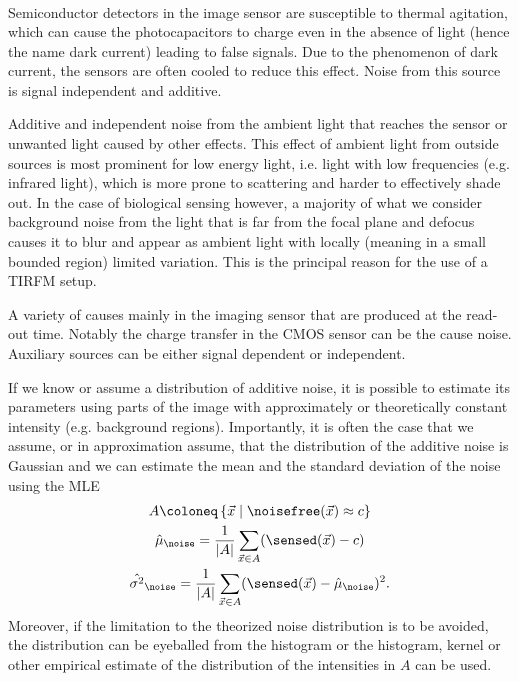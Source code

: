 \begin{description}
\begin{gather*}
            \end{gather*}
    \item[Dark current]
        Semiconductor detectors in the image sensor are susceptible to thermal agitation, which can 
            cause the photocapacitors to charge even in the absence of light (hence the name dark current) leading to 
            false signals.
        Due to the phenomenon of dark current, the sensors are often cooled to reduce this effect.
        Noise from this source is signal independent and additive.
    \item[Background noise]
        Additive and independent noise from the ambient light that reaches the sensor or unwanted light caused by other
            effects.
        This effect of ambient light from outside sources is most prominent for low energy light, i.e. light with low 
            frequencies (e.g. infrared light), which is more prone to scattering and harder to effectively shade out.
        In the case of biological sensing however, a majority of what we consider background noise from the light that 
            is far from the focal plane and defocus causes it to blur and appear as ambient light with locally (meaning 
            in a small bounded region) limited variation.
        This is the principal reason for the use of a \ac{TIRFM} setup.
    \item[Auxiliary sources]
        A variety of causes mainly in the imaging sensor that are produced at the read-out time.
        Notably the charge transfer in the \ac{CMOS} sensor can be the cause noise.
        Auxiliary sources can be either signal dependent or independent.
\end{description}

If we know or assume a distribution of additive noise, it is possible to estimate its parameters using parts of the
    image with approximately or theoretically constant intensity (e.g. background regions).
Importantly, it is often the case that we assume, or in approximation assume, that the distribution of the additive 
    noise is Gaussian and we can estimate the mean and the standard deviation of the noise using the \ac{MLE}
\begin{gather*}
    A \coloneq \left\{ \vec{x} \mid \noisefree(\vec{x}) \approx c  \right\} \\
    \hat{\mu}_{\noise} = \frac{1}{|A|} \sum_{\vec{x} \in A} (\sensed(\vec{x}) - c) \\
    \hat{\sigma^2}_{\noise} = \frac{1}{|A|} \sum_{\vec{x} \in  A} (\sensed(\vec{x}) - \hat{\mu}_{\noise})^2.
\end{gather*}
Moreover, if the limitation to the theorized noise distribution is to be avoided, the distribution can be eyeballed from
    the histogram or the histogram, kernel or other empirical estimate of the distribution of the intensities in \(A\)
    can be used.

